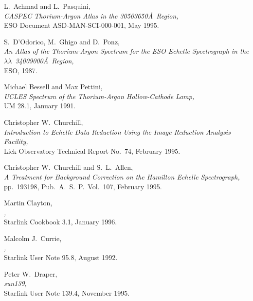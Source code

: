\newpage
{}
\label{se_references}
\begin{thebibliography}{999}

 L.~Achmad and L.~Pasquini,\\
      {\sl CASPEC Thorium-Argon Atlas in the 3050\sgspec{--}{-}3650\AA\
      Region,}\\
      ESO Document ASD-MAN-SCI-000-001, May 1995.

 S.~D'Odorico, M.~Ghigo and D.~Ponz,\\
      {\sl An Atlas of the Thorium-Argon Spectrum for the ESO Echelle
      Spectrograph in the $\lambda\lambda$~3400\sgspec{--}{-}9000\AA\ Region,}\\
      ESO, 1987.

 Michael Bessell and Max Pettini,\\
      {\sl UCLES Spectrum of the Thorium-Argon Hollow-Cathode Lamp,}\\
      \htmlref{{\bf AAO}}{gl_aao_aat} UM 28.1, January 1991.

 Christopher W.~Churchill,\\
      {\sl Introduction to Echelle Data Reduction Using the Image
      Reduction Analysis Facility,}\\
      Lick Observatory Technical Report No.~74, February 1995.

 Christopher W.~Churchill and S.~L.~Allen,\\
      {\sl A Treatment for Background Correction on the Hamilton Echelle
      Spectrograph,}\\
      pp.~193\sgspec{--}{-}198, Pub.~A.~S.~P.~Vol.~107, February 1995.

 Martin Clayton,\\
      {\sl {},}\\
      Starlink Cookbook 3.1, January 1996.

 Malcolm J.~Currie,\\
      {\sl {},}\\
      Starlink User Note 95.8, August 1992.

 Peter W.~Draper,\\
      {\sl {}
      {sun139}{},}\\
      Starlink User Note 139.4, November 1995.


\end{thebibliography}

